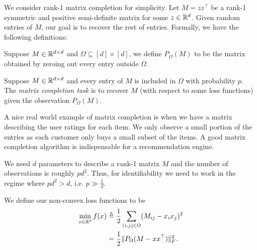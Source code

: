 

We consider rank-1 matrix completion for simplicity. Let $M = zz^\top$ be a rank-1 symmetric and positive semi-definite matrix for some $z\in \mathbb R^d$. Given random entries of $M$, our goal is to recover the rest of entries. Formally, we have the following definitions:

\begin{definition}
Suppose $M\in \mathbb R^{d\times d}$ and $\Omega \subseteq [d] \times [d]$, we define $P_{\Omega}(M)$ to be the matrix obtained by zeroing out every entry outside $\Omega$. 
\end{definition}

\begin{definition}
Suppose $M\in \mathbb R^{d\times d}$ and every entry of $M$ is included in $\Omega$ with probability $p$. The \textit{matrix completion task} is to recover $M$ (with respect to some loss functions) given the observation $P_{\Omega}(M)$.
\end{definition}

A nice real world example of matrix completion is when we have a matrix describing the user ratings for each item. We only observe a small portion of the entries as each customer only buys a small subset of the items. A good matrix completion algorithm is indispensable for a recommendation engine. 

\begin{remark}
We need $d$ parameters to describe a rank-1 matrix $M$ and the number of observations is roughly $pd^2$. Thus, for identifiability we need to work in the regime where $pd^2 > d$, i.e. $p \gg \frac{1}{d}$. 
\end{remark}

We define our non-convex loss functions to be 
\begin{align}
    \min_{x \in \mathbb R^d} f(x) & \triangleq \frac{1}{2}\sum_{(i,j)\in \Omega}(M_{ij}-x_ix_j)^2 \\
     & = \frac{1}{2}\|P_{\Omega}(M-xx^\top)\|_F^2.
\end{align}


